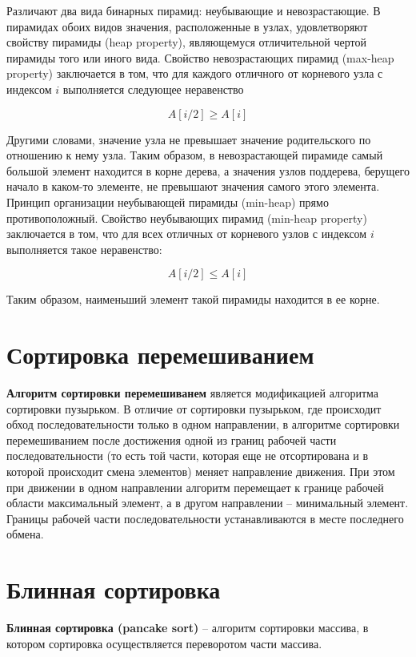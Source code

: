 Различают два вида бинарных пирамид: неубывающие и невозрастающие. В пирамидах обоих видов значения, расположенные в узлах, удовлетворяют свойству пирамиды (heap property), являющемуся отличительной чертой пирамиды того или иного вида. Свойство невозрастающих пирамид (max-heap property) заключается в том, что для каждого отличного от корневого узла с индексом $i$ выполняется следующее неравенство

\begin{equation}
	A[i / 2] \geq A[i]
\end{equation}

Другими словами, значение узла не превышает значение родительского по отношению к нему узла. Таким образом, в невозрастающей пирамиде самый большой элемент находится в корне дерева, а значения узлов поддерева, берущего начало в каком-то элементе, не превышают значения самого этого элемента. Принцип организации неубывающей пирамиды (min-heap) прямо противоположный. Свойство неубывающих пирамид (min-heap property) заключается в том, что для всех отличных от корневого узлов с индексом $i$ выполняется такое неравенство:

\begin{equation}
	A[i / 2] \leq A[i]
\end{equation}

Таким образом, наименьший элемент такой пирамиды находится в ее корне.

\section{Сортировка перемешиванием}
\textbf{Алгоритм сортировки перемешиванем} является модификацией алгоритма
сортировки пузырьком. В отличие от сортировки пузырьком, где происходит обход
последовательности только в одном направлении, в алгоритме сортировки
перемешиванием после достижения одной из границ рабочей части
последовательности (то есть той части, которая еще не отсортирована и в которой
происходит смена элементов) меняет направление движения. При этом при движении
в одном направлении алгоритм перемещает к границе рабочей области максимальный
элемент, а в другом направлении -- минимальный элемент. Границы рабочей части
последовательности устанавливаются в месте последнего обмена.\cite{sheyker}

\section{Блинная сортировка}
\textbf{Блинная сортировка (pancake sort)} – алгоритм сортировки массива, в котором сортировка осуществляется переворотом части массива.\cite{pancake}


